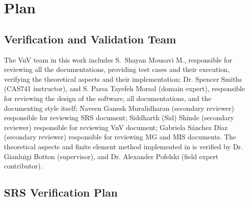 \documentclass[12pt, titlepage]{article}
\begin{document}
\section{Plan}
	
\subsection{Verification and Validation Team}

The VnV team in this work includes S.\ Shayan Mousavi M., responsible for reviewing all the documentations, providing test cases and their execution, verifying the theoretical aspects and their implementation; Dr. Spencer Smiths (CAS741 instructor), and S. Parsa Tayefeh Morsal (domain expert), responsible for reviewing the design of the software, all documentations, and the documenting style itself; Naveen Ganesh Muralidharan (secondary reviewer) responsible for reviewing SRS document; Siddharth (Sid) Shinde (secondary reviewer) responsible for reviewing VnV document; Gabriela Sánchez Díaz (secondary reviewer) responsible for reviewing MG and MIS documents. The theoretical aspects and finite element method implemented in \progname{} is verified by Dr. Gianluigi Botton (supervisor), and Dr. Alexander Pofelski (field expert contributor).



\subsection{SRS Verification Plan}
\end{document}
